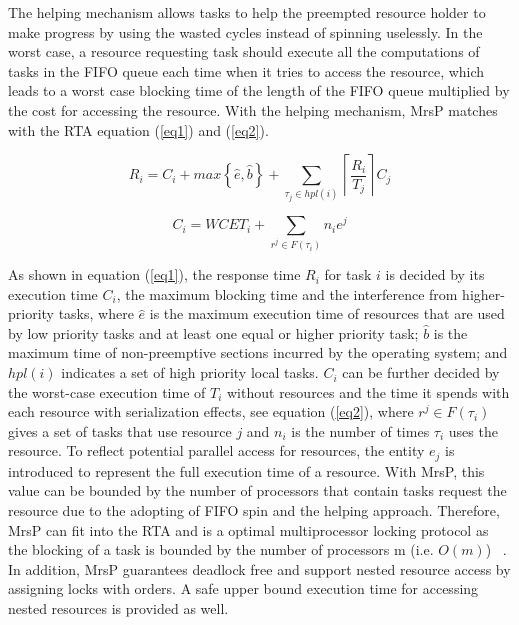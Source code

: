 \documentclass{report}
\begin{document}
The helping mechanism allows tasks to help the preempted resource holder to make progress by using the wasted cycles instead of spinning uselessly. In the worst case, a resource requesting task should execute all the computations of tasks in the FIFO queue each time when it tries to access the resource, which leads to a worst case blocking time of the length of the FIFO queue multiplied by the cost for accessing the resource. With the helping mechanism, MrsP matches with the RTA equation (\ref{eq1}) and (\ref{eq2}).

\begin{equation} \label{eq1}
R_{i}= C_{i}+ max\left \{ \widehat{e},\widehat{b} \right \} + \sum_{\tau _{j} \in hpl(i) }\left \lceil  \frac{R_{i}}{T_{j}}   \right \rceil C_{j} 
\end{equation}

\begin{equation} \label{eq2}
C_{i}=WCET_{i}+\sum_{r^{j}\in F(\tau _{i})}n_{i}e^{j}
\end{equation}

As shown in equation (\ref{eq1}), the response time $R_{i}$ for task $i$ is decided by its execution time $C_{i}$, the maximum blocking time and 
the interference from higher-priority tasks, where $\widehat{e}$ is the maximum execution time of resources that are used by low priority tasks and at least one equal or higher priority task; $\widehat{b}$ is the maximum time of non-preemptive sections incurred by the operating system; and $hpl(i)$ indicates a set of high priority local tasks. $C_{i}$ can be further decided by the worst-case execution time of $T_{i}$ without resources and the time it spends with each resource with serialization effects, see equation (\ref{eq2}), where $r^{j}\in F(\tau _{i})$ gives a set of tasks that use resource $j$ and $n_{i}$ is the number of times $\tau _{i}$ uses the resource. To reflect potential parallel access for resources, the entity $e_{j}$ is introduced to represent the full execution time of a resource. With MrsP, this value can be bounded by the number of processors that contain tasks request the resource due to the adopting of FIFO spin and the helping approach. Therefore, MrsP can fit into the RTA and is a optimal multiprocessor locking protocol as the blocking of a task is bounded by the number of processors m (i.e. $O(m)$) ~\cite{brandenburg2010optimality}. In addition, MrsP guarantees deadlock free and support nested resource access by assigning locks with orders. A safe upper bound execution time for accessing nested resources is provided as well.
\end{document}

